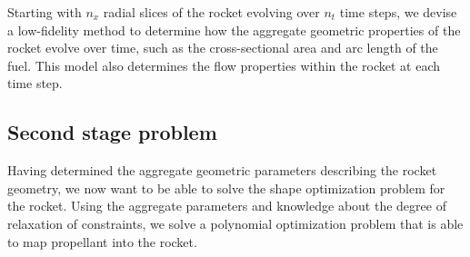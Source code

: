 Starting with $n_{x}$ radial slices of the rocket evolving over $n_t$ time steps,
we devise a low-fidelity method to determine how the aggregate geometric properties of the rocket
evolve over time, such as the cross-sectional area and arc length of the fuel. This model also determines
the flow properties within the rocket at each time step.

\subsection{Second stage problem}

Having determined the aggregate geometric parameters describing the rocket geometry, we
now want to be able to solve the shape optimization problem for the rocket. Using
the aggregate parameters and knowledge about the degree of relaxation of constraints,
we solve a polynomial optimization problem that is able to map propellant into the rocket.




%
%
